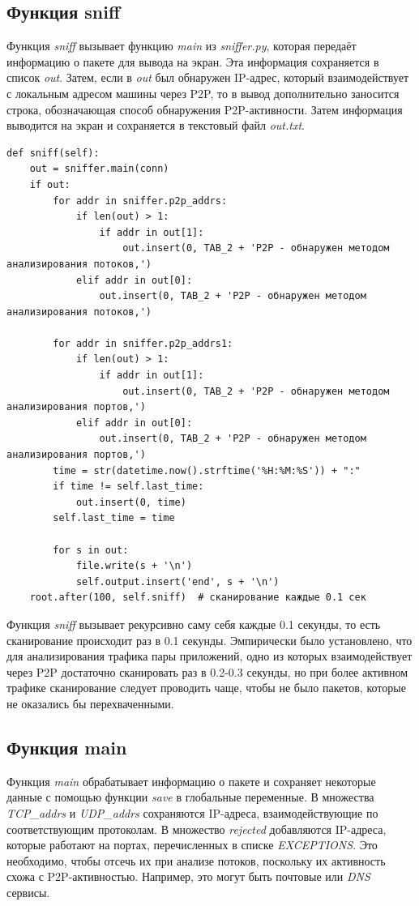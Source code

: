 \documentclass[bachelor, och, coursework]{SCWorks}
\begin{document}
\subsection{Функция sniff}
Функция \textit{sniff} вызывает функцию \textit{main} из \textit{sniffer.py}, которая передаёт информацию о пакете для вывода
на экран. Эта информация сохраняется в список \textit{out}. Затем, если в \textit{out} был обнаружен IP-адрес, который 
взаимодействует с локальным адресом машины через P2P, то в вывод дополнительно заносится строка, обозначающая способ
обнаружения P2P-активности. Затем информация выводится на экран и сохраняется в текстовый файл \textit{out.txt}.

\begin{verbatim}
def sniff(self):
    out = sniffer.main(conn)
    if out:
        for addr in sniffer.p2p_addrs:
            if len(out) > 1:
                if addr in out[1]:
                    out.insert(0, TAB_2 + 'P2P - обнаружен методом анализирования потоков,')
            elif addr in out[0]:
                out.insert(0, TAB_2 + 'P2P - обнаружен методом анализирования потоков,')

        for addr in sniffer.p2p_addrs1:
            if len(out) > 1:
                if addr in out[1]:
                    out.insert(0, TAB_2 + 'P2P - обнаружен методом анализирования портов,')
            elif addr in out[0]:
                out.insert(0, TAB_2 + 'P2P - обнаружен методом анализирования портов,')
        time = str(datetime.now().strftime('%H:%M:%S')) + ":"
        if time != self.last_time:
            out.insert(0, time)
        self.last_time = time

        for s in out:
            file.write(s + '\n')
            self.output.insert('end', s + '\n')
    root.after(100, self.sniff)  # сканирование каждые 0.1 сек
\end{verbatim}

Функция \textit{sniff} вызывает рекурсивно саму себя каждые 0.1 секунды, то есть сканирование происходит раз в 0.1 секунды.
Эмпирически было установлено, что для анализирования трафика пары приложений, одно из которых взаимодействует через P2P достаточно сканировать раз в 0.2-0.3 секунды, но при более активном трафике сканирование следует проводить чаще, чтобы не было пакетов, которые не оказались бы перехваченными.

\subsection{Функция main}
Функция \textit{main} обрабатывает информацию о пакете и сохраняет некоторые данные с помощью функции \textit{save} в глобальные переменные.
В множества \textit{TCP_addrs} и \textit{UDP_addrs} сохраняются IP-адреса, взаимодействующие по соответствующим протоколам.
В множество \textit{rejected} добавляются IP-адреса, которые работают на портах, перечисленных в списке \textit{EXCEPTIONS}. 
Это необходимо, чтобы отсечь их при анализе потоков, поскольку их активность схожа с P2P-активностью. Например, это могут быть 
почтовые или \textit{DNS} сервисы.
\end{document}
